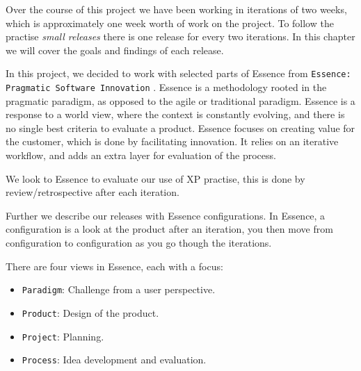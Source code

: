 Over the course of this project we have been working in iterations of two weeks, which is approximately one week worth of work on the project. To follow the practise \textit{small releases} there is one release for every two iterations. In this chapter we will cover the goals and findings of each release.

In this project, we decided to work with selected parts of Essence from \texttt{Essence: Pragmatic Software Innovation} \citep{essence:config}. Essence is a methodology rooted in the pragmatic paradigm, as opposed to the agile or traditional paradigm. Essence is a response to a world view, where the context is constantly evolving, and there is no single best criteria to evaluate a product. Essence focuses on creating value for the customer, which is done by facilitating innovation. It relies on an iterative workflow, and adds an extra layer for evaluation of the process.

We look to Essence to evaluate our use of XP practise, this is done by review/retrospective after each iteration.

Further we describe our releases with Essence configurations. In Essence, a configuration is a look at the product after an iteration, you then move from configuration to configuration as you go though the iterations. 

There are four views in Essence, each with a focus: 
\begin{itemize}
\item \texttt{Paradigm}: Challenge from a user perspective.
\item \texttt{Product}: Design of the product.
\item \texttt{Project}: Planning.
\item \texttt{Process}: Idea development and evaluation.
\end{itemize}



